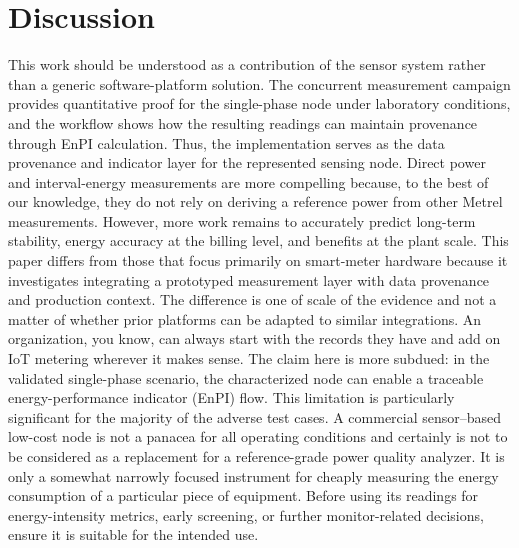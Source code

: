 \documentclass[technologies,article,submit,pdftex,moreauthors]{Definitions/mdpi}
\begin{document}
\section{Discussion}
\label{sec:discussion}
This work should be understood as a contribution of the sensor system rather than a generic software-platform solution. The concurrent measurement campaign provides quantitative proof for the single-phase node under laboratory conditions, and the workflow shows how the resulting readings can maintain provenance through EnPI calculation. Thus, the implementation serves as the data provenance and indicator layer for the represented sensing node. Direct power and interval-energy measurements are more compelling because, to the best of our knowledge, they do not rely on deriving a reference power from other Metrel measurements. However, more work remains to accurately predict long-term stability, energy accuracy at the billing level, and benefits at the plant scale.
This paper differs from those that focus primarily on smart-meter hardware because it investigates integrating a prototyped measurement layer with data provenance and production context. The difference is one of scale of the evidence and not a matter of whether prior platforms can be adapted to similar integrations. An organization, you know, can always start with the records they have and add on IoT metering wherever it makes sense. The claim here is more subdued: in the validated single-phase scenario, the characterized node can enable a traceable energy-performance indicator (EnPI) flow.
This limitation is particularly significant for the majority of the adverse test cases. A commercial sensor–based low-cost node is not a panacea for all operating conditions and certainly is not to be considered as a replacement for a reference-grade power quality analyzer. It is only a somewhat narrowly focused instrument for cheaply measuring the energy consumption of a particular piece of equipment. Before using its readings for energy-intensity metrics, early screening, or further monitor-related decisions, ensure it is suitable for the intended use. 
\end{document}
